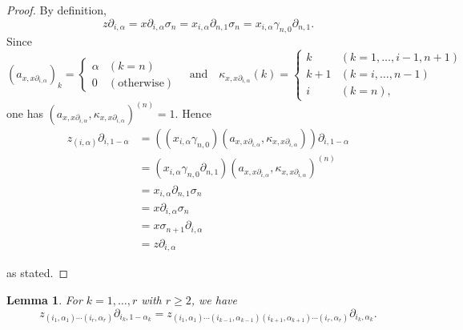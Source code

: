 \documentclass[oneside, 12pt]{amsart}
\numberwithin{equation}{section}
\theoremstyle{plain}
\newtheorem{lemma}[theorem]{Lemma}
\theoremstyle{definition}
\theoremstyle{remark}
\begin{document}
	\begin{proof}
		By definition,
		\[
		z\partial_{i,\alpha}=x\partial_{i,\alpha}\sigma_n=x_{i,\alpha}\partial_{n,1}\sigma_n=x_{i,\alpha}\gamma_{n,0}\partial_{n,1}.
		\]
		Since
		\[
		(a_{x,x\partial_{i,\alpha}})_k=
		\begin{cases}
			\alpha&(k=n)\\
			0&(\text{otherwise})
		\end{cases}
		\quad\text{and}\quad
		\kappa_{x,x\partial_{i,\alpha}}(k)=
		\begin{cases}
			k&(k=1,\ldots,i-1,n+1)\\
			k+1&(k=i,\ldots,n-1)\\
			i&(k=n),
		\end{cases}
		\]
		one has $(a_{x,x\partial_{i,\alpha}},\kappa_{x,x\partial_{i,\alpha}})^{(n)}=1$. Hence
		\begin{align*}
			z_{(i,\alpha)}\partial_{i,1-\alpha}&=((x_{i,\alpha}\gamma_{n,0})(a_{x,x\partial_{i,\alpha}},\kappa_{x,x\partial_{i,\alpha}}))\partial_{i,1-\alpha}\\
			&=(x_{i,\alpha}\gamma_{n,0}\partial_{n,1})(a_{x,x\partial_{i,\alpha}},\kappa_{x,x\partial_{i,\alpha}})^{(n)}\\
			&=x_{i,\alpha}\partial_{n,1}\sigma_n\\
			&=x\partial_{i,\alpha}\sigma_n\\
			&=x\sigma_{n+1}\partial_{i,\alpha}\\
			&=z\partial_{i,\alpha}
		\end{align*}
		
		as stated.
	\end{proof}
	
	
	
	\begin{lemma}
		\label{side face}
		For $k=1,\ldots,r$ with $r\ge 2$, we have
		\[
		z_{(i_1,\alpha_1)\cdots(i_r,\alpha_r)}\partial_{i_k,1-\alpha_k}=z_{(i_1,\alpha_1)\cdots(i_{k-1},\alpha_{k-1})(i_{k+1},\alpha_{k+1})\cdots(i_r,\alpha_r)}\partial_{i_k,\alpha_k}.
		\]
	\end{lemma}
	
\end{document}
